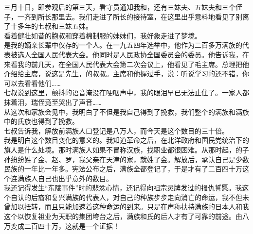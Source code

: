 三月十日，即参观后的第三天，看守员通知我和，还有三妹夫、五妹夫和三个侄子，一齐到所长那里去。我们走进了所长的接待室，在这里出乎意料地看见了别离了十多年的七叔和三妹五妹。\\

看着健壮如昔的胞叔和穿着棉制服的妹妹们，我好象走进了梦境。\\

是我的嫡亲长辈中仅存的一个人。在一九五四年选举中，他作为二百多万满族的代表被选人全国人民代表大会。他同时是人民政协全国委员会的委员。他告诉我，在来看我的前几天，在全国人民代表大会第二次会议上，他看见了毛主席。总理把他介绍给主席，说这是先生，的叔叔。主席和他握过手，说：听说学习的还不错，你可以去看看他们……\\

七叔说到这里，颤抖的语音淹没在哽咽声中，我的眼泪早已无法止住了。一家人都抹着泪，瑞侄竟至哭出了声音……\\

从这次和家族会见中，我明白了不但是我自己得到了挽救，我们整个的满族和满族中的氏族也得到了挽救。\\

七叔告诉我，解放前满族人口登记是八万人，而今天是这个数目的三十倍。\\

我是明白这个数目变化的意义的。我知道革命之后，在北洋政府和国民党统治下的旗人是什么处境。那时满族人如果不冒称汉族，找职业都很困难。从那时起，的子孙纷纷姓了金、赵、罗，我父亲在天津的家，就姓了金。解放后，承认自己是少数民族的一年比一年多。宪法公布之后，满族全都登记了，于是才有了二百四十万这个连满族人自己也出乎意外的数目。\\

我还记得发生“东陵事件”时的悲忿心情，还记得向祖宗灵牌发过的报仇誓愿。我这个自认的后裔和复兴满族的代表人，对自己的种族步步走向消亡的命运，我不但未曾加以扭转，而且只能加速着这种命运的到来。只是在声称扶持满族的日本人和我这个以恢复祖业为天职的集团垮台之后，满族和氏的后人才有了可靠的前途。由八万变成二百四十万，这就是一个证据！\\

